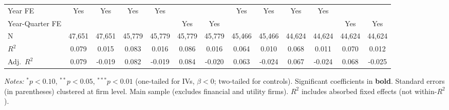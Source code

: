 \begin{landscape}
\begin{table}[H]
\begin{tabular}{lcccccccccccc}
Year FE & Yes & Yes & Yes & Yes &  &  & Yes & Yes & Yes & Yes &  &  \\
Year-Quarter FE &  &  &  &  & Yes & Yes &  &  &  &  & Yes & Yes \\
\midrule
N & 47,651 & 47,651 & 45,779 & 45,779 & 45,779 & 45,779 & 45,466 & 45,466 & 44,624 & 44,624 & 44,624 & 44,624 \\
$R^2$ & 0.079 & 0.015 & 0.083 & 0.016 & 0.086 & 0.016 & 0.064 & 0.010 & 0.068 & 0.011 & 0.070 & 0.012 \\
Adj.~$R^2$ & 0.079 & -0.019 & 0.082 & -0.019 & 0.084 & -0.020 & 0.063 & -0.024 & 0.067 & -0.024 & 0.068 & -0.025 \\
\bottomrule
\end{tabular}
\begin{minipage}{\linewidth}
\vspace{2pt}\scriptsize
\textit{Notes:} $^{*}p<0.10$, $^{**}p<0.05$, $^{***}p<0.01$ (one-tailed for IVs, $\beta < 0$; two-tailed for controls).
 Significant coefficients in \textbf{bold}.
 Standard errors (in parentheses) clustered at firm level.
 Main sample (excludes financial and utility firms).
 $R^2$ includes absorbed fixed effects (not within-$R^2$).
\end{minipage}
\end{table}
\end{landscape}